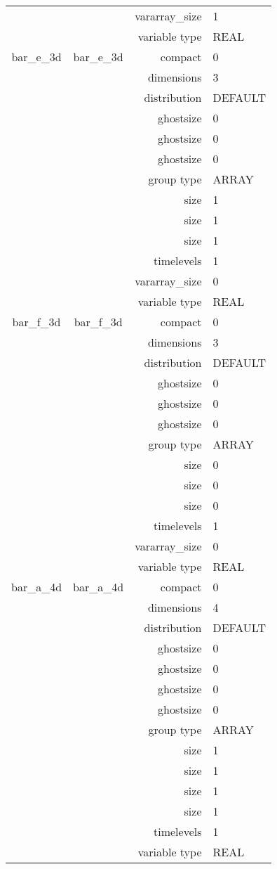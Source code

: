 \begin{tabular*}{150mm}{|c|c@{\extracolsep{\fill}}|rl|}
 &  & vararray\_size & 1 \\ 
 &  & variable type & REAL \\ 
\hline 
bar\_e\_3d & bar\_e\_3d & compact & 0 \\ 
 &  & dimensions & 3 \\ 
 &  & distribution & DEFAULT \\ 
 &  & ghostsize & 0 \\ 
& ~ & ghostsize & 0 \\ 
 &  & ghostsize & 0 \\ 
 &  & group type & ARRAY \\ 
 &  & size & 1 \\ 
& ~ & size & 1 \\ 
 &  & size & 1 \\ 
 &  & timelevels & 1 \\ 
 &  & vararray\_size & 0 \\ 
 &  & variable type & REAL \\ 
\hline 
bar\_f\_3d & bar\_f\_3d & compact & 0 \\ 
 &  & dimensions & 3 \\ 
 &  & distribution & DEFAULT \\ 
 &  & ghostsize & 0 \\ 
& ~ & ghostsize & 0 \\ 
 &  & ghostsize & 0 \\ 
 &  & group type & ARRAY \\ 
 &  & size & 0 \\ 
& ~ & size & 0 \\ 
 &  & size & 0 \\ 
 &  & timelevels & 1 \\ 
 &  & vararray\_size & 0 \\ 
 &  & variable type & REAL \\ 
\hline 
bar\_a\_4d & bar\_a\_4d & compact & 0 \\ 
 &  & dimensions & 4 \\ 
 &  & distribution & DEFAULT \\ 
 &  & ghostsize & 0 \\ 
& ~ & ghostsize & 0 \\ 
 &  & ghostsize & 0 \\ 
 &  & ghostsize & 0 \\ 
 &  & group type & ARRAY \\ 
 &  & size & 1 \\ 
& ~ & size & 1 \\ 
 &  & size & 1 \\ 
 &  & size & 1 \\ 
 &  & timelevels & 1 \\ 
 &  & variable type & REAL \\ 
\hline 
\end{tabular*} 



